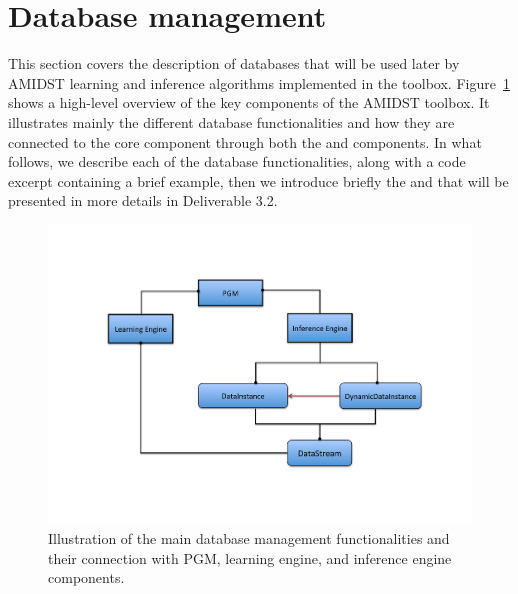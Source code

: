 \section{Database management} \label{sec:DataBases}

This section covers the description of databases that will be used later by AMIDST learning and inference algorithms implemented in the toolbox.  Figure~\ref{fig:DataBase} shows a high-level overview of the key components of the AMIDST toolbox. It illustrates mainly the different database functionalities and how they are connected to the core component  through both the  and  components. In what follows, we describe each of the database functionalities, along with a code excerpt containing a brief example, then we introduce briefly the  and  that will be presented in more details in Deliverable 3.2.

\vspace{-0.4in}
  \begin{figure}[ht!]
    \centering
    \includegraphics[width=\linewidth]{./figures/DataBase}
    \vspace{-0.8in}
    \caption{Illustration of the main database management functionalities and their connection with PGM, learning engine, and inference engine components. }
    \label{fig:DataBase}
  \end{figure}
 
